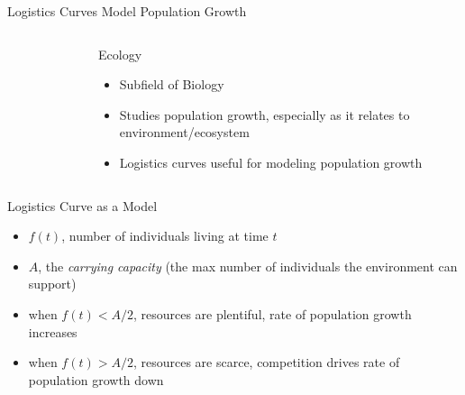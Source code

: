 \documentclass[10pt,aspectratio=1610,xcolor={dvipsnames}]{beamer}
\begin{document}
  \begin{frame}{Logistics Curves Model Population Growth}

    \begin{columns}

      \begin{figure}
        \scalebox{0.6}{}
      \end{figure}

      \begin{block}{Ecology}
        \begin{itemize}
          \item{Subfield of Biology}
          \item{Studies population growth, especially as it relates to environment/ecosystem}
          \item{Logistics curves useful for modeling population growth}
        \end{itemize}
      \end{block}

    \end{columns}

    \begin{block}{Logistics Curve as a Model}
      \begin{itemize}
        \item{$f(t)$, number of individuals living at time $t$}
        \item{$A$, the \emph{carrying capacity} (the max number of individuals the environment can support)}
        \item{when $f(t) < A / 2$, resources are plentiful, rate of population growth increases}
        \item{when $f(t) > A / 2$, resources are scarce, competition drives rate of population growth down}
      \end{itemize}
    \end{block}

  \end{frame}
\end{document}
